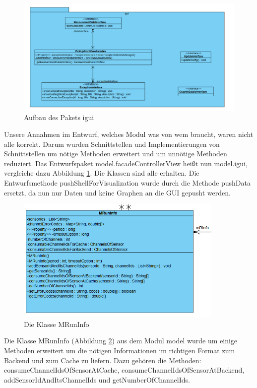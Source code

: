 \documentclass[parskip=full]{scrartcl}
\begin{document}
\begin{figure}[htbp]
	\begin{center}
		\includegraphics[width = 15cm]{Grafiken/igui.PNG}
		\caption{Aufbau des Pakets igui}
		\label{igui}
	\end{center}
\end{figure}

Unsere Annahmen im Entwurf, welches Modul was von wem braucht, waren nicht alle korrekt. Darum wurden Schnittstellen und Implementierungen von Schnittstellen um nötige Methoden erweitert und um unnötige Methoden reduziert.
Das Entwurfspaket model.facadeControllerView heißt nun model.igui, vergleiche dazu Abbildung \ref{igui}. Die Klassen sind alle erhalten. Die Entwurfsmethode pushShellForVisualization wurde durch die Methode pushData ersetzt, da nun nur Daten und keine Graphen an die GUI gepusht werden.

\begin{figure}[htbp]
	\begin{center}
		\includegraphics[width = 10cm]{Grafiken/mruninfo.PNG}
		\caption{Die Klasse MRunInfo}
		\label{mruninfo}
	\end{center}
\end{figure}

Die Klasse MRunInfo (Abbildung \ref{mruninfo}) aus dem Modul model wurde um einige Methoden erweitert um die nötigen Informationen im richtigen Format zum Backend und zum Cache zu liefern. Dazu gehören die Methoden: consumeChannelIdsOfSensorAtCache, consumeChannelIdsOfSensorAtBackend, addSensorIdAndItsChannelIds und getNumberOfChannelIds. 
\end{document}

